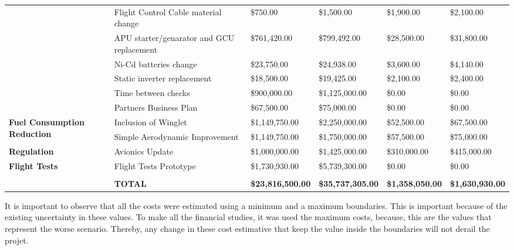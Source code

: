 \begin{table}[H]
\begin{tabular}{| p{3cm} | p{4cm} | l | l | l | l |}
          & Flight Control Cable material change & \$750.00 & \$1,500.00 & \$1,900.00 & \$2,100.00 \\
          & APU starter/genarator and GCU replacement & \$761,420.00 & \$799,492.00 & \$28,500.00 & \$31,800.00 \\
          & Ni-Cd batteries change & \$23,750.00 & \$24,938.00 & \$3,600.00 & \$4,140.00 \\
          & Static inverter replacement & \$18,500.00 & \$19,425.00 & \$2,100.00 & \$2,400.00 \\
          & Time between checks & \$900,000.00 & \$1,125,000.00 & \$0.00 & \$0.00 \\
          & Partners Business Plan & \$67,500.00 & \$75,000.00 & \$0.00 & \$0.00 \\
    \multirow{2}[4]{*}{\textbf{Fuel Consumption Reduction}} & Inclusion of Winglet & \$1,149,750.00 & \$2,250,000.00 & \$52,500.00 & \$67,500.00 \\
          & Simple Aerodynamic Improvement & \$1,149,750.00 & \$1,750,000.00 & \$57,500.00 & \$75,000.00 \\
    \textbf{Regulation} & Avionics Update & \$1,000,000.00 & \$1,425,000.00 & \$310,000.00 & \$415,000.00 \\
    \textbf{Flight Tests} & Flight Tests Prototype & \$1,730,930.00 & \$5,739,300.00 & \$0.00 & \$0.00 \\
          &       &       &       &       &  \\
          & \textbf{TOTAL} & \textbf{\$23,816,500.00} & \textbf{\$35,737,305.00} & \textbf{\$1,358,050.00} & \textbf{\$1,630,930.00} \\
    \bottomrule
    \end{tabular}%
  \label{tab:costsCompilation}%
\end{table}%

It is important to observe that all the costs were estimated using a minimum and a maximum boundaries. This is important because of the existing uncertainty in these values. To make all the financial studies, it was used the maximum costs, because, this are the values that represent the worse scenario. Thereby, any change in these cost estimative that keep the value inside the boundaries will not derail the projet.
